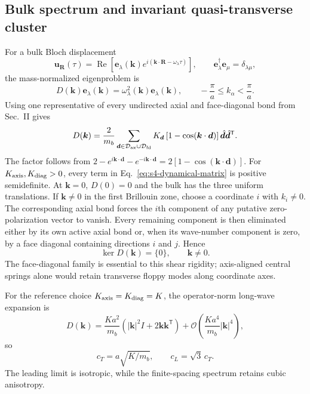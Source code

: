 \documentclass[10pt,aps,pre,reprint,floatfix,notitlepage,nofootinbib]{revtex4-2}
\newcommand{\vk}{\bm{k}}
\newcommand{\ve}{\bm{e}}
\newcommand{\vu}{\bm{u}}
\newcommand{\vR}{\bm{R}}
\newcommand{\order}{\mathcal O}
\begin{document}
\subsection{Bulk spectrum and invariant quasi-transverse cluster}
\label{sec:s4-bulk-spectrum}

For a bulk Bloch displacement
\begin{equation}
  \vu_{\vR}(\tau)
  =\operatorname{Re}\!\left[
    \ve_\lambda(\vk)
    e^{i(\vk\cdot\vR-\omega_\lambda\tau)}
  \right],
  \qquad
  \ve_\lambda^\dagger\ve_\mu=\delta_{\lambda\mu},
  \label{eq:s4-bloch-convention}
\end{equation}
the mass-normalized eigenproblem is
\begin{equation}
  D(\vk)\ve_\lambda(\vk)
  =\omega_\lambda^2(\vk)\ve_\lambda(\vk),
  \qquad
  -\frac{\pi}{a}\leq k_\alpha<\frac{\pi}{a}.
  \label{eq:s4-eigenproblem}
\end{equation}
Using one representative of every undirected axial and face-diagonal bond from Sec.~II gives
\begin{equation}
  D(\vk)
  =\frac{2}{m_b}
   \sum_{\bm d\in\mathcal D_{\rm ax}\cup\mathcal D_{\rm fd}}
   K_{\bm d}
   \left[1-\cos(\vk\cdot\bm d)\right]
   \hat{\bm d}\hat{\bm d}^{\mathsf T}.
  \label{eq:s4-dynamical-matrix}
\end{equation}
The factor follows from
$2-e^{i\vk\cdot\bm d}-e^{-i\vk\cdot\bm d}
 =2[1-\cos(\vk\cdot\bm d)]$.
For $K_{\rm axis},K_{\rm diag}>0$, every term in Eq.~\eqref{eq:s4-dynamical-matrix} is positive semidefinite.  At $\vk=0$, $D(0)=0$ and the bulk has the three uniform translations.  If $\vk\neq0$ in the first Brillouin zone, choose a coordinate $i$ with $k_i\neq0$.  The corresponding axial bond forces the $i$th component of any putative zero-polarization vector to vanish.  Every remaining component is then eliminated either by its own active axial bond or, when its wave-number component is zero, by a face diagonal containing directions $i$ and $j$.  Hence
\begin{equation}
  \ker D(\vk)=\{0\},
  \qquad \vk\neq0.
  \label{eq:s4-rigidity}
\end{equation}
The face-diagonal family is essential to this shear rigidity; axis-aligned central springs alone would retain transverse floppy modes along coordinate axes.

For the reference choice $K_{\rm axis}=K_{\rm diag}=K$, the operator-norm long-wave expansion is
\begin{equation}
  D(\vk)
  =\frac{Ka^2}{m_b}
   \left(|\vk|^2 I+2\vk\vk^{\mathsf T}\right)
   +\order\!\left(\frac{Ka^4}{m_b}|\vk|^4\right),
  \label{eq:s4-long-wave}
\end{equation}
so
\begin{equation}
  c_T=a\sqrt{K/m_b},
  \qquad
  c_L=\sqrt3\,c_T.
  \label{eq:s4-acoustic-speeds}
\end{equation}
The leading limit is isotropic, while the finite-spacing spectrum retains cubic anisotropy.
\end{document}
